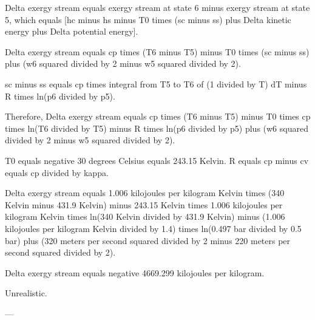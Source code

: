 Delta exergy stream equals exergy stream at state 6 minus exergy stream at state 5, which equals [hc minus hs minus T0 times (sc minus ss) plus Delta kinetic energy plus Delta potential energy].  

Delta exergy stream equals cp times (T6 minus T5) minus T0 times (sc minus ss) plus (w6 squared divided by 2 minus w5 squared divided by 2).  

sc minus ss equals cp times integral from T5 to T6 of (1 divided by T) dT minus R times ln(p6 divided by p5).  

Therefore, Delta exergy stream equals cp times (T6 minus T5) minus T0 times cp times ln(T6 divided by T5) minus R times ln(p6 divided by p5) plus (w6 squared divided by 2 minus w5 squared divided by 2).  

T0 equals negative 30 degrees Celsius equals 243.15 Kelvin.  
R equals cp minus cv equals cp divided by kappa.  

Delta exergy stream equals 1.006 kilojoules per kilogram Kelvin times (340 Kelvin minus 431.9 Kelvin) minus 243.15 Kelvin times 1.006 kilojoules per kilogram Kelvin times ln(340 Kelvin divided by 431.9 Kelvin) minus (1.006 kilojoules per kilogram Kelvin divided by 1.4) times ln(0.497 bar divided by 0.5 bar) plus (320 meters per second squared divided by 2 minus 220 meters per second squared divided by 2).  

Delta exergy stream equals negative 4669.299 kilojoules per kilogram.  

Unrealistic.  

---